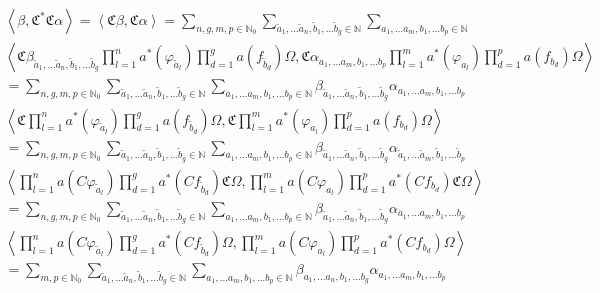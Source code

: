 \documentclass[a4paper,12pt]{article}
\begin{document}
\begin{multline}
\left< \beta ,\mathfrak{C}^*\mathfrak{C} \alpha\right> =\left<\mathfrak{C} \beta, \mathfrak{C}\alpha\right>= 
\sum_{n,g,m,p \in \mathbb{N}_0} \sum_{\tilde{a}_1, \dots \tilde{a}_n, \tilde{b}_1 , \dots \tilde{b}_g \in \mathbb{N}}  \sum_{a_1, \dots a_m, b_1 , \dots b_p \in \mathbb{N}}\\
\left< \mathfrak{C}  \beta_{\tilde{a}_1,\dots \tilde{a}_n, \tilde{b}_1, \dots \tilde{b}_g} \prod_{l=1}^n a^*(\varphi_{\tilde{a}_l}) \prod_{d=1}^g a(f_{\tilde{b}_d}) \Omega, \mathfrak{C}  \alpha_{a_1,\dots a_m, b_1, \dots b_p} \prod_{l=1}^m a^*(\varphi_{a_l}) \prod_{d=1}^p a(f_{b_d}) \Omega\right> \\
= \sum_{n,g,m,p \in \mathbb{N}_0} \sum_{\tilde{a}_1, \dots \tilde{a}_n, \tilde{b}_1 , \dots \tilde{b}_g \in \mathbb{N}}  \sum_{a_1, \dots a_m, b_1 , \dots b_p \in \mathbb{N}}\beta_{\tilde{a}_1,\dots \tilde{a}_n, \tilde{b}_1, \dots \tilde{b}_g} \alpha_{a_1,\dots a_m, b_1, \dots b_p} \\
\left< \mathfrak{C}   \prod_{l=1}^n a^*(\varphi_{\tilde{a}_l}) \prod_{d=1}^g a(f_{\tilde{b}_d}) \Omega, \mathfrak{C}   \prod_{l=1}^m a^*(\varphi_{a_l}) \prod_{d=1}^p a(f_{b_d}) \Omega\right> \\
= \sum_{n,g,m,p \in \mathbb{N}_0} \sum_{\tilde{a}_1, \dots \tilde{a}_n, \tilde{b}_1 , \dots \tilde{b}_g \in \mathbb{N}}  \sum_{a_1, \dots a_m, b_1 , \dots b_p \in \mathbb{N}}\beta_{\tilde{a}_1,\dots \tilde{a}_n, \tilde{b}_1, \dots \tilde{b}_g} \alpha_{\tilde{a}_1,\dots \tilde{a}_m, \tilde{b}_1, \dots \tilde{b}_p} \\
\left<   \prod_{l=1}^n a(C \varphi_{\tilde{a}_l}) \prod_{d=1}^g a^*(C f_{\tilde{b}_d}) \mathfrak{C} \Omega,    \prod_{l=1}^m a(C \varphi_{a_l}) \prod_{d=1}^p a^*(C f_{b_d}) \mathfrak{C}  \Omega\right> \\
= \sum_{n,g,m,p \in \mathbb{N}_0} \sum_{\tilde{a}_1, \dots \tilde{a}_n, \tilde{b}_1 , \dots \tilde{b}_g \in \mathbb{N}}  \sum_{a_1, \dots a_m, b_1 , \dots b_p \in \mathbb{N}}\beta_{\tilde{a}_1,\dots \tilde{a}_n, \tilde{b}_1, \dots \tilde{b}_g} \alpha_{a_1,\dots a_m, b_1, \dots b_p} \\
\left<   \prod_{l=1}^n a(C \varphi_{\tilde{a}_l}) \prod_{d=1}^g a^*(C f_{\tilde{b}_d})  \Omega,    \prod_{l=1}^m a(C \varphi_{a_l}) \prod_{d=1}^p a^*(C f_{b_d})  \Omega\right> \\
= \sum_{m,p \in \mathbb{N}_0} \sum_{\tilde{a}_1, \dots \tilde{a}_n, \tilde{b}_1 , \dots \tilde{b}_g \in \mathbb{N}}  \sum_{a_1, \dots a_m, b_1 , \dots b_p \in \mathbb{N}}\beta_{a_1,\dots a_n, b_1, \dots b_g} \alpha_{a_1,\dots a_m, b_1, \dots b_p} \\

\end{multline}
\end{document}
